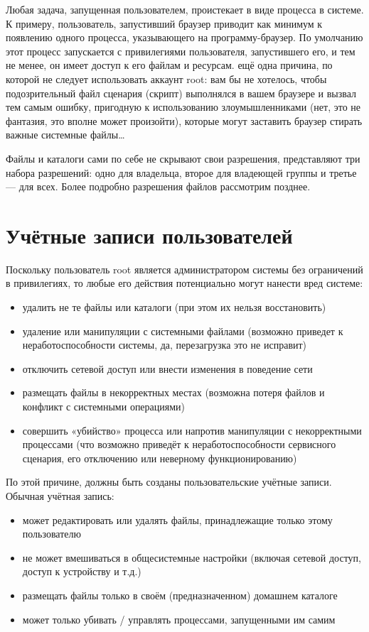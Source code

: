 \documentclass[10pt]{book}
\begin{document}
Любая задача, запущенная пользователем, проистекает в виде процесса  в системе. К примеру,  пользователь, запустивший браузер приводит как минимум к появлению одного процесса, указывающего на программу-браузер. По умолчанию этот процесс запускается с привилегиями пользователя, запустившего его, и тем не менее, он имеет доступ к его файлам и ресурсам. ещё одна причина, по которой не следует использовать аккаунт root: вам бы не хотелось, чтобы подозрительный файл сценария (скрипт) выполнялся в вашем браузере и вызвал тем самым ошибку, пригодную к использованию злоумышленниками (нет, это не фантазия, это вполне может произойти), которые могут заставить браузер стирать важные системные файлы\ldots

Файлы и каталоги сами по себе не скрывают свои разрешения, представляют три набора разрешений: одно для владельца, второе для владеющей группы и третье — для всех. Более подробно разрешения файлов рассмотрим позднее.

\section{Учётные записи пользователей}

Поскольку пользователь root является администратором системы без ограничений в привилегиях, то любые его действия потенциально могут нанести вред системе:

\begin{itemize}
	\item удалить не те файлы или каталоги (при этом их нельзя восстановить)
	\item удаление или манипуляции с системными файлами (возможно приведет к неработоспособности системы, да, перезагрузка это не исправит)
	\item отключить сетевой доступ или внести изменения в поведение сети
	\item размещать файлы в некорректных местах (возможна потеря файлов и конфликт с системными операциями)
	\item совершить «убийство» процесса или напротив манипуляции с некорректными процессами (что возможно приведёт к неработоспособности сервисного сценария, его отключению или неверному функционированию)
\end{itemize}

По этой причине, должны быть созданы пользовательские учётные записи. Обычная учётная запись:

\begin{itemize}
	\item может редактировать или удалять файлы, принадлежащие только этому пользователю
	\item не может вмешиваться в общесистемные настройки (включая сетевой доступ, доступ к устройству и т.д.)
	\item размещать файлы только в своём (предназначенном) домашнем каталоге
	\item может только убивать / управлять процессами, запущенными им самим
\end{itemize}
\end{document}
